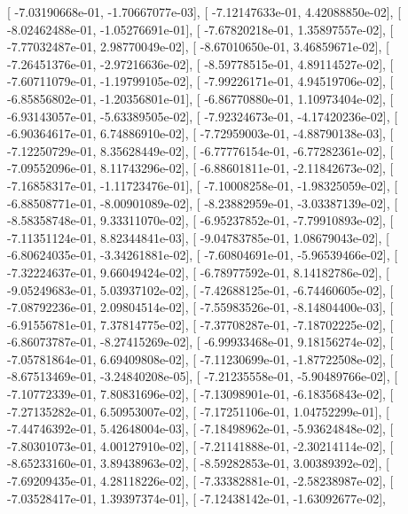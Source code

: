 \documentclass{article}
\begin{document}
       [ -7.03190668e-01,  -1.70667077e-03],
       [ -7.12147633e-01,   4.42088850e-02],
       [ -8.02462488e-01,  -1.05276691e-01],
       [ -7.67820218e-01,   1.35897557e-02],
       [ -7.77032487e-01,   2.98770049e-02],
       [ -8.67010650e-01,   3.46859671e-02],
       [ -7.26451376e-01,  -2.97216636e-02],
       [ -8.59778515e-01,   4.89114527e-02],
       [ -7.60711079e-01,  -1.19799105e-02],
       [ -7.99226171e-01,   4.94519706e-02],
       [ -6.85856802e-01,  -1.20356801e-01],
       [ -6.86770880e-01,   1.10973404e-02],
       [ -6.93143057e-01,  -5.63389505e-02],
       [ -7.92324673e-01,  -4.17420236e-02],
       [ -6.90364617e-01,   6.74886910e-02],
       [ -7.72959003e-01,  -4.88790138e-03],
       [ -7.12250729e-01,   8.35628449e-02],
       [ -6.77776154e-01,  -6.77282361e-02],
       [ -7.09552096e-01,   8.11743296e-02],
       [ -6.88601811e-01,  -2.11842673e-02],
       [ -7.16858317e-01,  -1.11723476e-01],
       [ -7.10008258e-01,  -1.98325059e-02],
       [ -6.88508771e-01,  -8.00901089e-02],
       [ -8.23882959e-01,  -3.03387139e-02],
       [ -8.58358748e-01,   9.33311070e-02],
       [ -6.95237852e-01,  -7.79910893e-02],
       [ -7.11351124e-01,   8.82344841e-03],
       [ -9.04783785e-01,   1.08679043e-02],
       [ -6.80624035e-01,  -3.34261881e-02],
       [ -7.60804691e-01,  -5.96539466e-02],
       [ -7.32224637e-01,   9.66049424e-02],
       [ -6.78977592e-01,   8.14182786e-02],
       [ -9.05249683e-01,   5.03937102e-02],
       [ -7.42688125e-01,  -6.74460605e-02],
       [ -7.08792236e-01,   2.09804514e-02],
       [ -7.55983526e-01,  -8.14804400e-03],
       [ -6.91556781e-01,   7.37814775e-02],
       [ -7.37708287e-01,  -7.18702225e-02],
       [ -6.86073787e-01,  -8.27415269e-02],
       [ -6.99933468e-01,   9.18156274e-02],
       [ -7.05781864e-01,   6.69409808e-02],
       [ -7.11230699e-01,  -1.87722508e-02],
       [ -8.67513469e-01,  -3.24840208e-05],
       [ -7.21235558e-01,  -5.90489766e-02],
       [ -7.10772339e-01,   7.80831696e-02],
       [ -7.13098901e-01,  -6.18356843e-02],
       [ -7.27135282e-01,   6.50953007e-02],
       [ -7.17251106e-01,   1.04752299e-01],
       [ -7.44746392e-01,   5.42648004e-03],
       [ -7.18498962e-01,  -5.93624848e-02],
       [ -7.80301073e-01,   4.00127910e-02],
       [ -7.21141888e-01,  -2.30214114e-02],
       [ -8.65233160e-01,   3.89438963e-02],
       [ -8.59282853e-01,   3.00389392e-02],
       [ -7.69209435e-01,   4.28118226e-02],
       [ -7.33382881e-01,  -2.58238987e-02],
       [ -7.03528417e-01,   1.39397374e-01],
       [ -7.12438142e-01,  -1.63092677e-02],
\end{document}
